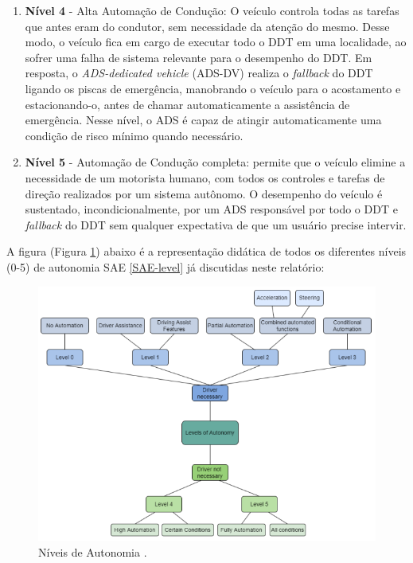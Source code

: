 \begin{enumerate}
\item \textbf{Nível 4} - Alta Automação de Condução: O veículo controla todas as tarefas 
que antes eram do condutor, sem necessidade da atenção do mesmo. Desse modo, o veículo fica em cargo de executar todo o DDT em uma localidade, ao sofrer uma falha de sistema relevante para o desempenho do DDT. Em resposta, o \textit{ADS-dedicated vehicle} (ADS-DV) realiza o \textit{fallback} do DDT ligando os piscas de emergência, manobrando o veículo para o acostamento e estacionando-o, antes de chamar automaticamente a assistência de emergência. Nesse  nível, o ADS é capaz de atingir automaticamente uma condição de risco mínimo quando necessário.

\item \textbf{Nível 5} - Automação de Condução completa: permite que o veículo elimine a necessidade de um motorista humano, com todos os controles e tarefas de direção realizados por um sistema autônomo. O desempenho do veículo é sustentado, incondicionalmente, por um ADS responsável por todo o DDT e \textit{fallback} do DDT sem qualquer expectativa de que um usuário precise intervir.

\end{enumerate}

A figura (Figura \ref{niveis-auto}) abaixo é a representação didática de todos os diferentes níveis (0-5) de autonomia SAE \ref{SAE-level} já discutidas neste relatório:

\begin{figure}[H]
\centering
\includegraphics[width=\textwidth]{Figures/level-auto.png}
\caption{Níveis de Autonomia \cite{review-auto}.}
\label{niveis-auto}
\end{figure}

